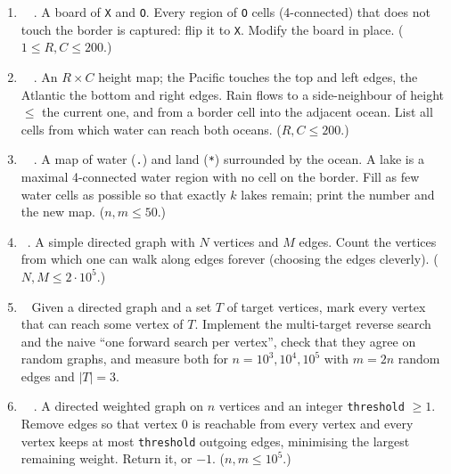 \exlegend
\begin{enumerate}[leftmargin=*, label=\textbf{E5.\arabic*}, itemsep=6pt]
    \item \exeasy\ \pclassic {}\ . A board of \texttt{X} and \texttt{O}. Every region of \texttt{O} cells (4-connected) that does not touch the border is captured: flip it to \texttt{X}. Modify the board in place. ($1 \le R, C \le 200$.)
    \item \exmedium\ \pclassic {}\ . An $R \times C$ height map; the Pacific touches the top and left edges, the Atlantic the bottom and right edges. Rain flows to a side-neighbour of height $\le$ the current one, and from a border cell into the adjacent ocean. List all cells from which water can reach both oceans. ($R, C \le 200$.)
    \item \exmedium\ \ptricky {}\ . A map of water (\texttt{.}) and land (\texttt{*}) surrounded by the ocean. A lake is a maximal 4-connected water region with no cell on the border. Fill as few water cells as possible so that exactly $k$ lakes remain; print the number and the new map. ($n, m \le 50$.)
    \item \exmedium\ \pconcept {}. A simple directed graph with $N$ vertices and $M$ edges. Count the vertices from which one can walk along edges forever (choosing the edges cleverly). ($N, M \le 2 \cdot 10^5$.)
    \item \exmedium\ \pconcept {} Given a directed graph and a set $T$ of target vertices, mark every vertex that can reach some vertex of $T$. Implement the multi-target reverse search and the naive ``one forward search per vertex'', check that they agree on random graphs, and measure both for $n = 10^3, 10^4, 10^5$ with $m = 2n$ random edges and $|T| = 3$.
    \item \exhard\ \precent {}\ . A directed weighted graph on $n$ vertices and an integer \texttt{threshold} $\ge 1$. Remove edges so that vertex 0 is reachable from every vertex and every vertex keeps at most \texttt{threshold} outgoing edges, minimising the largest remaining weight. Return it, or $-1$. ($n, m \le 10^5$.)
\end{enumerate}

